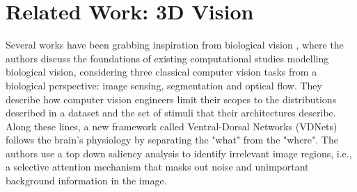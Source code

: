 \section{Related Work: 3D Vision}\label{appendix:rlwork-3dvision}
Several works have been grabbing inspiration from biological vision \cite{medathati2016bio}, where the authors discuss the foundations of existing computational studies modelling biological vision, considering three classical computer vision tasks from a biological perspective: image sensing, segmentation and optical flow. They describe how computer vision engineers limit their scopes to the distributions described in a dataset and the set of stimuli that their architectures describe.
%
Along these lines, a new framework called Ventral-Dorsal Networks (VDNets) \cite{ebrahimpour2019ventral} follows the brain's physiology by separating the "what" from the "where". The authors use a top down saliency analysis to identify irrelevant image regions, i.e., a selective attention mechanism that masks out noise and unimportant background information in the image. 
% 

